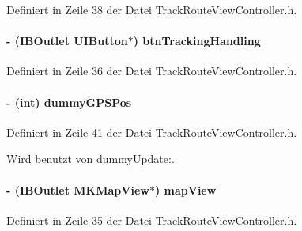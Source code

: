Definiert in Zeile 38 der Datei TrackRouteViewController.h.\hypertarget{interface_track_route_view_controller_ad5dac71250de25316647ab4f8b3d5ade}{
\paragraph[{btnTrackingHandling}]{\setlength{\rightskip}{0pt plus 5cm}-\/ (IBOutlet UIButton$\ast$) {\bf btnTrackingHandling}}\hfill}
\label{interface_track_route_view_controller_ad5dac71250de25316647ab4f8b3d5ade}


Definiert in Zeile 36 der Datei TrackRouteViewController.h.\hypertarget{interface_track_route_view_controller_ae26e0607317b6f8389a08dc7951e18cd}{
\paragraph[{dummyGPSPos}]{\setlength{\rightskip}{0pt plus 5cm}-\/ (int) {\bf dummyGPSPos}}\hfill}
\label{interface_track_route_view_controller_ae26e0607317b6f8389a08dc7951e18cd}


Definiert in Zeile 41 der Datei TrackRouteViewController.h.

Wird benutzt von dummyUpdate:.\hypertarget{interface_track_route_view_controller_acfdb8629be1a1a142886ecdedbffd9a9}{
\paragraph[{mapView}]{\setlength{\rightskip}{0pt plus 5cm}-\/ (IBOutlet MKMapView$\ast$) {\bf mapView}}\hfill}
\label{interface_track_route_view_controller_acfdb8629be1a1a142886ecdedbffd9a9}


Definiert in Zeile 35 der Datei TrackRouteViewController.h.

